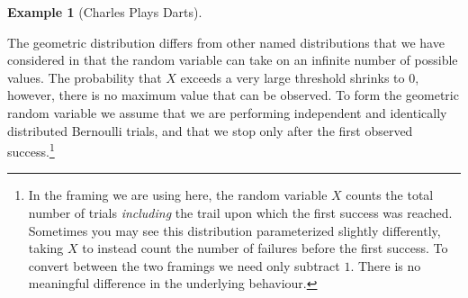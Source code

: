 \documentclass[
  letterpaper,
  DIV=11,
  numbers=noendperiod]{scrreprt}
\theoremstyle{definition}
\theoremstyle{definition}
\newtheorem{example}{Example}[chapter]
\theoremstyle{definition}
\theoremstyle{remark}
\begin{document}
\begin{example}[Charles Plays
Darts]
\begin{tcolorbox}[enhanced jigsaw, colback=white, colframe=quarto-callout-color-frame, arc=.35mm, leftrule=.75mm, rightrule=.15mm, opacityback=0, breakable, bottomrule=.15mm, left=2mm, toprule=.15mm]
\end{tcolorbox}

\end{example}

The geometric distribution differs from other named distributions that
we have considered in that the random variable can take on an infinite
number of possible values. The probability that \(X\) exceeds a very
large threshold shrinks to \(0\), however, there is no maximum value
that can be observed. To form the geometric random variable we assume
that we are performing independent and identically distributed Bernoulli
trials, and that we stop only after the first observed
success.\footnote{In the framing we are using here, the random variable
  \(X\) counts the total number of trials \emph{including} the trail
  upon which the first success was reached. Sometimes you may see this
  distribution parameterized slightly differently, taking \(X\) to
  instead count the number of failures before the first success. To
  convert between the two framings we need only subtract \(1\). There is
  no meaningful difference in the underlying behaviour.}
\end{document}
